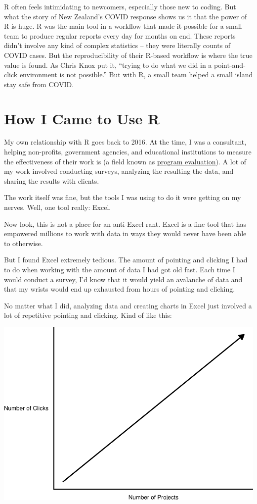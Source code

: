 \documentclass[
]{book}
\begin{document}
R often feels intimidating to newcomers, especially those new to coding. But what the story of New Zealand's COVID response shows us it that the power of R is huge. R was the main tool in a workflow that made it possible for a small team to produce regular reports every day for months on end. These reports didn't involve any kind of complex statistics -- they were literally counts of COVID cases. But the reproducibility of their R-based workflow is where the true value is found. As Chris Knox put it, ``trying to do what we did in a point-and-click environment is not possible.'' But with R, a small team helped a small island stay safe from COVID.

\hypertarget{how-i-came-to-use-r}{%
\section*{How I Came to Use R}\label{how-i-came-to-use-r}}

My own relationship with R goes back to 2016. At the time, I was a consultant, helping non-profits, government agencies, and educational institutions to measure the effectiveness of their work is (a field known as \href{https://www.cdc.gov/evaluation/index.htm}{program evaluation}). A lot of my work involved conducting surveys, analyzing the resulting the data, and sharing the results with clients.

The work itself was fine, but the tools I was using to do it were getting on my nerves. Well, one tool really: Excel.

Now look, this is not a place for an anti-Excel rant. Excel is a fine tool that has empowered millions to work with data in ways they would never have been able to otherwise.

But I found Excel extremely tedious. The amount of pointing and clicking I had to do when working with the amount of data I had got old fast. Each time I would conduct a survey, I'd know that it would yield an avalanche of data and that my wrists would end up exhausted from hours of pointing and clicking.

No matter what I did, analyzing data and creating charts in Excel just involved a lot of repetitive pointing and clicking. Kind of like this:

\includegraphics[width=1\linewidth]{introduction_files/figure-latex/unnamed-chunk-2-1}
\end{document}
